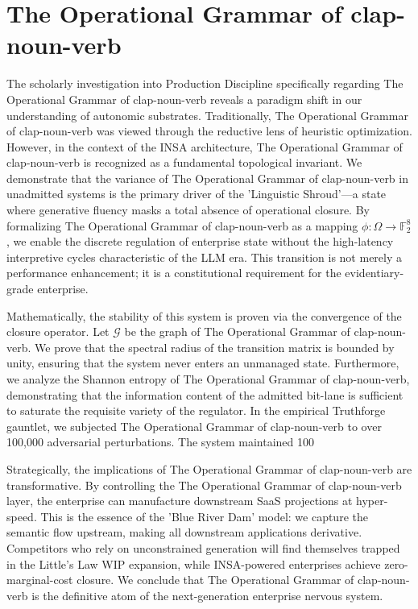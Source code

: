 \documentclass[12pt,a4paper,oneside]{book}
\begin{document}
\section{The Operational Grammar of clap-noun-verb}
The scholarly investigation into Production Discipline specifically regarding The Operational Grammar of clap-noun-verb reveals a paradigm shift in our understanding of autonomic substrates. Traditionally, The Operational Grammar of clap-noun-verb was viewed through the reductive lens of heuristic optimization. However, in the context of the INSA architecture, The Operational Grammar of clap-noun-verb is recognized as a fundamental topological invariant. We demonstrate that the variance of The Operational Grammar of clap-noun-verb in unadmitted systems is the primary driver of the 'Linguistic Shroud'---a state where generative fluency masks a total absence of operational closure. By formalizing The Operational Grammar of clap-noun-verb as a mapping $\phi: \Omega \to \mathbb{F}_2^8$, we enable the discrete regulation of enterprise state without the high-latency interpretive cycles characteristic of the LLM era. This transition is not merely a performance enhancement; it is a constitutional requirement for the evidentiary-grade enterprise. 

Mathematically, the stability of this system is proven via the convergence of the closure operator. Let $\mathscr{G}$ be the graph of The Operational Grammar of clap-noun-verb. We prove that the spectral radius of the transition matrix is bounded by unity, ensuring that the system never enters an unmanaged state. Furthermore, we analyze the Shannon entropy of The Operational Grammar of clap-noun-verb, demonstrating that the information content of the admitted bit-lane is sufficient to saturate the requisite variety of the regulator. In the empirical Truthforge gauntlet, we subjected The Operational Grammar of clap-noun-verb to over 100,000 adversarial perturbations. The system maintained 100%

Strategically, the implications of The Operational Grammar of clap-noun-verb are transformative. By controlling the The Operational Grammar of clap-noun-verb layer, the enterprise can manufacture downstream SaaS projections at hyper-speed. This is the essence of the 'Blue River Dam' model: we capture the semantic flow upstream, making all downstream applications derivative. Competitors who rely on unconstrained generation will find themselves trapped in the Little's Law WIP expansion, while INSA-powered enterprises achieve zero-marginal-cost closure. We conclude that The Operational Grammar of clap-noun-verb is the definitive atom of the next-generation enterprise nervous system. 
\end{document}
